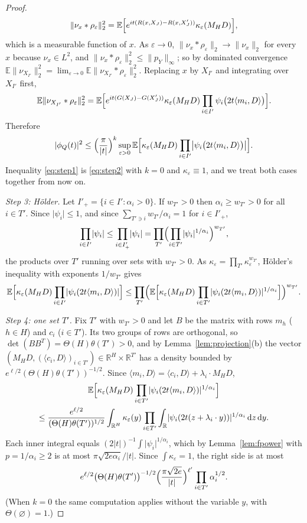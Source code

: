 \documentclass[11pt]{amsart}
\numberwithin{equation}{section}
\theoremstyle{definition}
\theoremstyle{remark}
\newcommand{\R}{\mathbb R}
\newcommand{\E}{\mathbb E}
\newcommand{\1}{\mathbf 1}
\newcommand{\dd}{\,\mathrm d}
\newcommand{\norm}[1]{\lVert #1\rVert}
\newcommand{\abs}[1]{\lvert #1\rvert}
\begin{document}
\begin{proof}
\[
\norm{\nu_x*\rho_\varepsilon}_2^2=\E\Bigl[e^{it(R(x,X_J)-R(x,X_J'))}\kappa_\varepsilon(M_HD)\Bigr],
\]
which is a measurable function of $x$. As $\varepsilon\to0$, $\norm{\nu_x*\rho_\varepsilon}_2\to\norm{\nu_x}_2$ for every $x$ because $\nu_x\in L^2$, and $\norm{\nu_x*\rho_\varepsilon}_2^2\le\norm{p_Y}_\infty$; so by dominated convergence $\E\norm{\nu_{X_{I'}}}_2^2=\lim_{\varepsilon\to0}\E\norm{\nu_{X_{I'}}*\rho_\varepsilon}_2^2$. Replacing $x$ by $X_{I'}$ and integrating over $X_{I'}$ first,
\[
\E\norm{\nu_{X_{I'}}*\rho_\varepsilon}_2^2=\E\Bigl[e^{it(G(X_J)-G(X_J'))}\kappa_\varepsilon(M_HD)\prod_{i\in I'}\psi_i\bigl(2t\langle m_i,D\rangle\bigr)\Bigr].
\]
Therefore
\begin{equation}\label{eq:step2}
\abs{\phi_Q(t)}^2\le\Bigl(\frac\pi{\abs t}\Bigr)^k\sup_{\varepsilon>0}\E\Bigl[\kappa_\varepsilon(M_HD)\prod_{i\in I'}\bigl\lvert\psi_i\bigl(2t\langle m_i,D\rangle\bigr)\bigr\rvert\Bigr].
\end{equation}
Inequality \eqref{eq:step1} is \eqref{eq:step2} with $k=0$ and $\kappa_\varepsilon\equiv1$, and we treat both cases together from now on.

\emph{Step 3: H\"older.} Let $I'_+=\{i\in I':\alpha_i>0\}$. If $w_{T'}>0$ then $\alpha_i\ge w_{T'}>0$ for all $i\in T'$. Since $\abs{\psi_i}\le1$, and since $\sum_{T'\ni i}w_{T'}/\alpha_i=1$ for $i\in I'_+$,
\[
\prod_{i\in I'}\abs{\psi_i}\le\prod_{i\in I'_+}\abs{\psi_i}=\prod_{T'}\Bigl(\prod_{i\in T'}\abs{\psi_i}^{1/\alpha_i}\Bigr)^{w_{T'}},
\]
the products over $T'$ running over sets with $w_{T'}>0$. As $\kappa_\varepsilon=\prod_{T'}\kappa_\varepsilon^{w_{T'}}$, H\"older's inequality with exponents $1/w_{T'}$ gives
\[
\E\Bigl[\kappa_\varepsilon(M_HD)\prod_{i\in I'}\abs{\psi_i(2t\langle m_i,D\rangle)}\Bigr]\le\prod_{T'}\Bigl(\E\Bigl[\kappa_\varepsilon(M_HD)\prod_{i\in T'}\abs{\psi_i(2t\langle m_i,D\rangle)}^{1/\alpha_i}\Bigr]\Bigr)^{w_{T'}}.
\]

\emph{Step 4: one set $T'$.} Fix $T'$ with $w_{T'}>0$ and let $B$ be the matrix with rows $m_h$ ($h\in H$) and $c_i$ ($i\in T'$). Its two groups of rows are orthogonal, so $\det(BB^T)=\Theta(H)\theta(T')>0$, and by Lemma~\ref{lem:projection}(b) the vector $(M_HD,(\langle c_i,D\rangle)_{i\in T'})\in\R^H\times\R^{T'}$ has a density bounded by $e^{\ell/2}(\Theta(H)\theta(T'))^{-1/2}$. Since $\langle m_i,D\rangle=\langle c_i,D\rangle+\lambda_i\cdot M_HD$,
\begin{multline*}
\E\Bigl[\kappa_\varepsilon(M_HD)\prod_{i\in T'}\abs{\psi_i(2t\langle m_i,D\rangle)}^{1/\alpha_i}\Bigr]\\
\le\frac{e^{\ell/2}}{(\Theta(H)\theta(T'))^{1/2}}\int_{\R^H}\kappa_\varepsilon(y)\prod_{i\in T'}\int_\R\abs{\psi_i(2t(z+\lambda_i\cdot y))}^{1/\alpha_i}\dd z\dd y .
\end{multline*}
Each inner integral equals $(2\abs t)^{-1}\int\abs{\psi_i}^{1/\alpha_i}$, which by Lemma~\ref{lem:fpower} with $p=1/\alpha_i\ge2$ is at most $\pi\sqrt{2e\alpha_i}/\abs t$. Since $\int\kappa_\varepsilon=1$, the right side is at most
\[
e^{\ell/2}\bigl(\Theta(H)\theta(T')\bigr)^{-1/2}\Bigl(\frac{\pi\sqrt{2e}}{\abs t}\Bigr)^{\ell'}\prod_{i\in T'}\alpha_i^{1/2}.
\]
(When $k=0$ the same computation applies without the variable $y$, with $\Theta(\varnothing)=1$.)


\end{proof}
\end{document}
